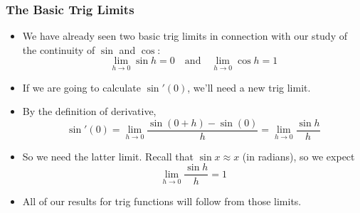 \documentclass[ignorenonframetext]{beamer}
\begin{document}
\begin{frame}
  \frametitle{The Basic Trig Limits}
  \begin{itemize}[<+->]
  \item We have already seen two basic trig limits in connection with
    our study of the continuity of $\sin$ and $\cos$:
    \begin{displaymath}
      \lim_{h\to 0} \sin h = 0
      \quad\mbox{and}\quad
      \lim_{h\to 0} \cos h = 1
    \end{displaymath}
  \item If we are going to calculate $\sin'(0)$, we'll need a new trig
    limit.
  \item By the definition of derivative,
    \begin{displaymath}
      \sin'(0) = \lim_{h\to 0} \frac{\sin(0+h)-\sin(0)}{h}
      = \lim_{h\to 0} \frac{\sin h}{h}
    \end{displaymath}
  \item So we need the latter limit.  Recall
    that $\sin x \approx x$ (in radians), so we expect
    \begin{displaymath}
      \lim_{h\to 0} \frac{\sin h}{h} = 1
    \end{displaymath}
  \item All of our results for trig functions
    will follow from those limits.
  \end{itemize}
\end{frame}
\end{document}
